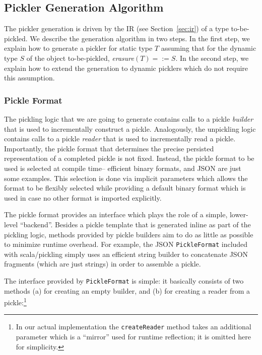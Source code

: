 \documentclass[preprint,10pt]{sigplanconf}
\theoremstyle{definition}
\theoremstyle{definition}
\newcommand{\term}[1]{\mbox{\texttt{#1}}}
\begin{document}
\subsection{Pickler Generation Algorithm}

The pickler generation is driven by the IR (see Section~\ref{sec:ir}) of a
type to-be-pickled. We describe the generation algorithm in two steps. In the
first step, we explain how to generate a pickler for static type $T$ assuming
that for the dynamic type $S$ of the object to-be-pickled,
\textit{erasure}$(T) =:= S$. In the second step, we explain how to extend the
generation to dynamic picklers which do not require this assumption.

\subsubsection{Pickle Format}
\label{sec:pickleformat}

The pickling logic that we are going to generate contains calls to a pickle
{\em builder} that is used to incrementally construct a pickle. Analogously,
the unpickling logic contains calls to a pickle {\em reader} that is used to
incrementally read a pickle. Importantly, the pickle format that determines
the precise persisted representation of a completed pickle is not fixed.
Instead, the pickle format to be used is selected at compile time-- efficient
binary formats, and JSON are just some examples. This selection is done via
implicit parameters which allows the format to be flexibly selected while
providing a default binary format which is used in case no other format is
imported explicitly.

The pickle format provides an interface which plays the role of a simple,
lower-level ``backend''. Besides a pickle template that is generated inline as
part of the pickling logic, methods provided by pickle builders aim to do as
little as possible to minimize runtime overhead. For example,  the JSON
\term{PickleFormat} included with scala/pickling simply uses an
efficient string builder to concatenate JSON fragments (which are just
strings) in order to assemble a pickle.

The interface provided by \term{PickleFormat} is simple: it basically consists
of two methods (a) for creating an empty builder, and (b) for creating a
reader from a pickle:\footnote{In our actual implementation the
\term{createReader} method takes an additional parameter which is a ``mirror''
used for runtime reflection; it is omitted here for simplicity.}
\end{document}

